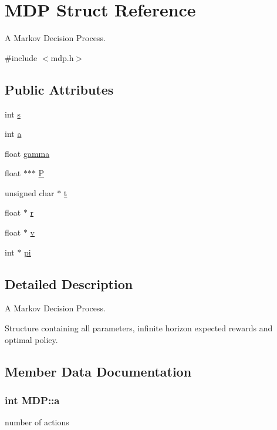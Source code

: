 \hypertarget{structMDP}{}\section{M\+DP Struct Reference}
\label{structMDP}


A Markov Decision Process.  




{\ttfamily \#include $<$mdp.\+h$>$}

\subsection*{Public Attributes}
\begin{DoxyCompactItemize}
\item 
int \hyperlink{structMDP_aa735fb802768fb82ff8e05eb9d99ef51}{s}
\item 
int \hyperlink{structMDP_ae25a44e2b3d9f22a4f3fd6296b3602c5}{a}
\item 
float \hyperlink{structMDP_a313e7a8dc1cb9a04af91936c9daf2c62}{gamma}
\item 
float $\ast$$\ast$$\ast$ \hyperlink{structMDP_a395623fbc3e1cc9190c5acbfe4471462}{P}
\item 
unsigned char $\ast$ \hyperlink{structMDP_a70ae114113478796bd398bca88f32aa1}{t}
\item 
float $\ast$ \hyperlink{structMDP_a8335e6f1093b7551784a41cc902ef9c8}{r}
\item 
float $\ast$ \hyperlink{structMDP_ade484756ff98adafbc4c5ebbd2668b2d}{v}
\item 
int $\ast$ \hyperlink{structMDP_aeba26ff8087d7dc83fda5bd779965928}{pi}
\end{DoxyCompactItemize}


\subsection{Detailed Description}
A Markov Decision Process. 

Structure containing all parameters, infinite horizon expected rewards and optimal policy. 

\subsection{Member Data Documentation}
\subsubsection[{\texorpdfstring{a}{a}}]{\setlength{\rightskip}{0pt plus 5cm}int M\+D\+P\+::a}\hypertarget{structMDP_ae25a44e2b3d9f22a4f3fd6296b3602c5}{}\label{structMDP_ae25a44e2b3d9f22a4f3fd6296b3602c5}
number of actions 
